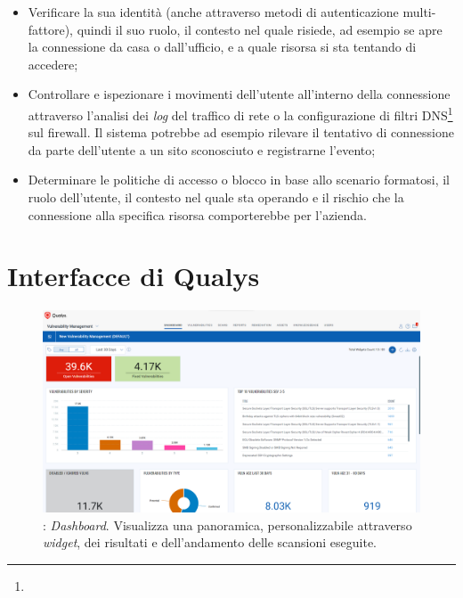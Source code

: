 \documentclass[target=bach,aauheader=]{thud}
\begin{document}
\begin{itemize}
    \item Verificare la sua identità (anche attraverso metodi di autenticazione multi-fattore), quindi il suo ruolo, il contesto nel quale risiede, ad esempio se apre la connessione da casa o dall'ufficio, e a quale risorsa si sta tentando di accedere;
    \item Controllare e ispezionare i movimenti dell'utente all'interno della connessione attraverso l'analisi dei \textit{log} del traffico di rete o la configurazione di filtri DNS\footnote{} sul firewall. Il sistema potrebbe ad esempio rilevare il tentativo di connessione da parte dell'utente a un sito sconosciuto e registrarne l'evento;
    \item Determinare le politiche di accesso o blocco in base allo scenario formatosi, il ruolo dell'utente, il contesto nel quale sta operando e il rischio che la connessione alla specifica risorsa comporterebbe per l'azienda.
\end{itemize} 


\appendix


\chapter{Interfacce di Qualys}
\label{appendix:a}

\begin{figure}[h]
\centering
    \includegraphics[scale=0.329]{images/qualys_dashboard.png}
    \caption{: \textit{Dashboard}. Visualizza una panoramica, personalizzabile attraverso \textit{widget}, dei risultati e dell'andamento delle scansioni eseguite.}
\end{figure}
\end{document}
